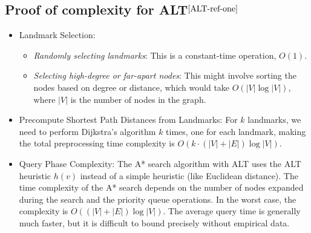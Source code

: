 \begin{appendices}
\section{Proof of complexity for ALT$^{\cite{ALT-ref-one}}$}\label{appendix:ALT:complexity}
	\begin{itemize}
		\item Landmark Selection:
			\begin{itemize}
				\item \textit{Randomly selecting landmarks}: This is a constant-time operation, $ O(1) $.
				\item \textit{Selecting high-degree or far-apart nodes}: This might involve sorting the nodes based on degree or distance, which would take $ O(|V| \log |V|) $, where $ |V| $ is the number of nodes in the graph.
			\end{itemize}
		\item Precompute Shortest Path Distances from Landmarks: For $k$ landmarks, we need to perform Dijkstra’s algorithm $k$ times, one for each landmark, making the total preprocessing time complexity is $O(k \cdot (|V| + |E|) \log |V|)$.
		\item Query Phase Complexity: The A* search algorithm with ALT uses the ALT heuristic $ h(v) $ instead of a simple heuristic (like Euclidean distance). The time complexity of the A* search depends on the number of nodes expanded during the search and the priority queue operations. In the worst case, the complexity is $ O((|V| + |E|) \log |V|) $. The average query time is generally much faster, but it is difficult to bound precisely without empirical data.		
	\end{itemize}
	
\end{appendices}